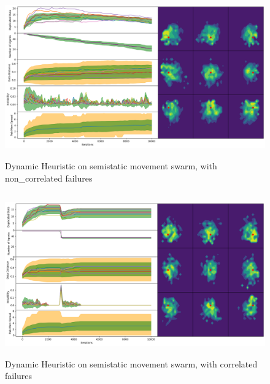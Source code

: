 \documentclass{UoYCSproject}
\begin{document}
\begin{figure}[htb]
\label{fig:static_movement_non2}
\begin{center}
\centering
\includegraphics[height=7cm]{"./Dynamic_Heuristic/Static_Move_non.png"}
\caption{Dynamic Heuristic on semi\-static movement swarm, with non\_correlated failures}
\end{center}
\end{figure}

\begin{figure}[htb]
\label{fig:static_movement_con2}
\begin{center}
\centering
\includegraphics[height=7cm]{"./Dynamic_Heuristic/Static_Move_con.png"}
\caption{Dynamic Heuristic on semi\-static movement swarm, with correlated failures}
\end{center}
\end{figure}
\end{document}
